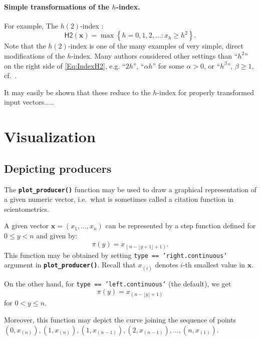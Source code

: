 \documentclass[11pt]{article}\usepackage{graphicx, color}
\newcommand{\hlfunctioncall}[1]{\textcolor[rgb]{0.501960784313725,0,0.329411764705882}{\textbf{#1}}}%
\newcommand{\Rfunc}[1]{\texttt{\hlfunctioncall{#1}}}
\newcommand{\vect}[1]{{\mathbf{#1}}}
\newcommand{\func}[1]{{\mathsf{#1}}}
\theoremstyle{remark}
\theoremstyle{definition}
\begin{document}
\paragraph{Simple transformations of the $h$-index.}
For example, The $h(2)$-index \cite{Kosmulski2006:h2}:
\begin{equation}\label{Eq:IndexH2}
\func{H2}(\vect{x}) = \max\left\{h=0,1,2,\ldots: {x}_{h} \ge h^2\right\}. %
\end{equation}
Note that the $h(2)$-index is one of the many examples of very
simple, direct modifications of the $h$-index.
Many authors considered other settings than ``$h^2$'' on the right
side of \eqref{Eq:IndexH2}, e.g. ``$2h$'', ``$\alpha h$'' for some
$\alpha > 0$, or ``$h^\beta$'', $\beta\ge 1$, cf.~\cite{AlonsoETAL2009:hreview}.

It may easily be shown that these reduce to the $h$-index for
properly transformed input vectors.....



\section{Visualization}


\subsection{Depicting producers}

The \Rfunc{plot\_producer()} function may be used to draw
a graphical representation of a given numeric vector,
i.e.~what is sometimes called a citation function in scientometrics.

A given vector $\mathbf{x}=(x_1,\dots,x_n)$ can be represented by a
step function defined for $0\le y<n$ and given by:
\[
   \pi(y)=x_{(n-\lfloor y+1\rfloor+1)}.
\]
This function may be obtained by setting \texttt{type == 'right.continuous'}
argument in \Rfunc{plot\_pro\-du\-cer()}.
Recall that $x_{(i)}$ denotes $i$-th smallest value in $\vect{x}$.

On the other hand, for \texttt{type == 'left.continuous'}
(the default), we get
\[
\pi(y)=x_{(n-\lfloor y\rfloor+1)}
\]
for $0< y\le n$.

Moreover, this function may depict the curve joining the sequence
of points $(0, x_{(n)}), (1, x_{(n)}),\allowbreak (1, x_{(n-1)}), (2, x_{(n-1)}),
\dots, (n, x_{(1)})$.
\end{document}

